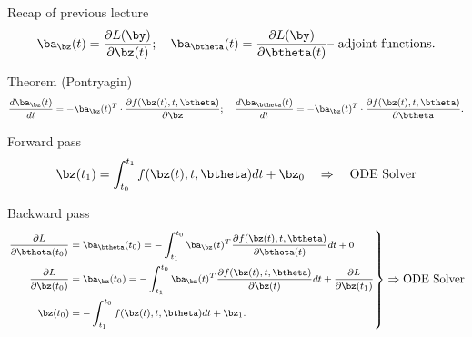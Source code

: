 

\usepackage{tikz}

\usetikzlibrary{arrows,shapes,positioning,shadows,trees}

\begin{frame}
\titlepage
\end{frame}
\begin{frame}{Recap of previous lecture}
		\vspace{-0.3cm}
		\[
		\ba_{\bz}(t) = \frac{\partial L(\by)}{\partial \bz(t)}; \quad \ba_{\btheta}(t) = \frac{\partial L(\by)}{\partial \btheta(t)} \text{-- adjoint functions}.
		\]
		\vspace{-0.3cm}
	\begin{block}{Theorem (Pontryagin)}
	\vspace{-0.6cm}
	\[
		\frac{d \ba_{\bz}(t)}{dt} = - \ba_{\bz}(t)^T \cdot \frac{\partial f(\bz(t), t, \btheta)}{\partial \bz}; \quad \frac{d \ba_{\btheta}(t)}{dt} = - \ba_{\bz}(t)^T \cdot \frac{\partial f(\bz(t), t, \btheta)}{\partial \btheta}.
	\]
	\vspace{-0.6cm}
	\end{block}
	\begin{block}{Forward pass}
		\vspace{-0.5cm}
		\[
		\bz(t_1) = \int^{t_1}_{t_0} f(\bz(t), t, \btheta) d t  + \bz_0 \quad \Rightarrow \quad \text{ODE Solver}
		\]
		\vspace{-0.6cm}
	\end{block}
	\begin{block}{Backward pass}
		\vspace{-0.6cm}
		\begin{equation*}
			\left.
			{\footnotesize 
				\begin{aligned}
					\frac{\partial L}{\partial \btheta(t_0)} &= \ba_{\btheta}(t_0) =  - \int_{t_1}^{t_0} \ba_{\bz}(t)^T \frac{\partial f(\bz(t), t, \btheta)}{\partial \btheta(t)} dt + 0 \\
					\frac{\partial L}{\partial \bz(t_0)} &= \ba_{\bz}(t_0) =  - \int_{t_1}^{t_0} \ba_{\bz}(t)^T \frac{\partial f(\bz(t), t, \btheta)}{\partial \bz(t)} dt + \frac{\partial L}{\partial \bz(t_1)} \\
					\bz(t_0) &= - \int^{t_0}_{t_1} f(\bz(t), t, \btheta) d t  + \bz_1.
				\end{aligned}
			}
			\right\rbrace
			\Rightarrow
			\text{ODE Solver}
		\end{equation*}
		\vspace{-0.4cm} 
	\end{block}
\end{frame}
